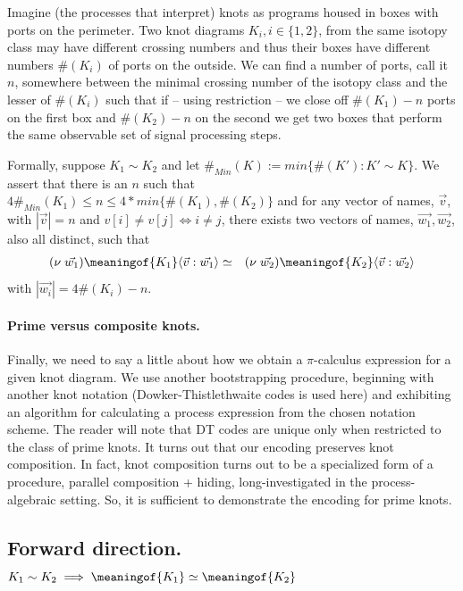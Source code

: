 Imagine (the processes that interpret) knots as programs housed in
boxes with ports on the perimeter. Two knot diagrams $K_i, i \in \{1,2\}$, from
the same isotopy class may have different crossing numbers and thus
their boxes have different numbers $\#(K_i)$ of ports on the outside. We can find a number of ports, call it $n$, somewhere
between the minimal crossing number of the isotopy class and the
lesser of $\#(K_i)$ such that if -- using restriction -- we close off
$\#(K_1) - n$ ports on the first box and $\#(K_2) - n$ on the second
we get two boxes that perform the same observable set of signal
processing steps.

Formally, suppose $K_{1} \sim K_{2}$ and let $\#_{Min}(K) :=
min\{\#(K') : K' \sim K \}$. We assert that there is an $n$ such that   
$4\#_{Min}(K_1) \leq n \leq 4*min\{ \#(K_1), \#(K_2) \}$ and for
any vector of names, $\vec{v}$, with $|\vec{v}| = n$ and $v[i] \neq
v[j] \iff i \neq j $, there exists two vectors of names, $\vec{w_1},
\vec{w_2}$, also all distinct, such that
\begin{eqnarray}
    (\nu \; \vec{w_1})\meaningof{K_{1}}\langle \vec{v}:\vec{w_1} \rangle & \simeq & (\nu \; \vec{w_2})\meaningof{K_{2}}\langle \vec{v}:\vec{w_2} \rangle \nonumber
  \end{eqnarray}
  with $|\vec{w_i}| = 4\#(K_{i}) - n$.

  \paragraph{Prime versus composite knots.} Finally, we need to say a
  little about how we obtain a $\pi$-calculus expression for a given
  knot diagram. We use another bootstrapping procedure, beginning with another
  knot notation (Dowker-Thistlethwaite codes is used here) and
  exhibiting an algorithm for calculating a process expression from the chosen notation scheme. The reader will
  note that DT codes are  unique only when restricted to the class of prime knots. It turns out
  that our encoding preserves knot composition. In fact, knot
  composition turns out to be a specialized form of a procedure,
  parallel composition + hiding, long-investigated in the
  process-algebraic setting. So, it is sufficient to demonstrate the
  encoding for prime knots.

\subsection{Forward direction. $ K_1 \sim K_2  \implies  \meaningof{K_1} \simeq \meaningof{K_2}$}

